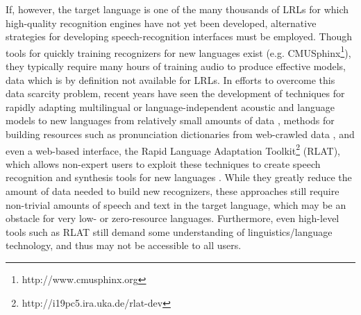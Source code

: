\documentclass[11pt]{article}
\begin{document}
If, however, the target language is one of the many thousands of LRLs for which high-quality recognition engines have not yet been developed, alternative strategies for developing speech-recognition interfaces must be employed.
Though tools for quickly training recognizers for new languages exist (e.g. CMUSphinx\footnote{http://www.cmusphinx.org}), they typically require many hours of training audio to produce effective models, 
data which is by definition not available for LRLs.
In efforts to overcome this data scarcity problem, 
recent years have seen the development of 
techniques for rapidly adapting multilingual or language-independent acoustic and language models to new languages from relatively small amounts of data \cite{schultz01,kim03}, methods for building resources such as pronunciation dictionaries from web-crawled data \cite{Schlippe14}, and even a web-based interface, the Rapid Language Adaptation Toolkit\footnote{http://i19pc5.ira.uka.de/rlat-dev}
(RLAT), 
which allows non-expert users to exploit these techniques to create speech recognition and synthesis tools for new languages \cite{vu10}. 
While they greatly reduce the amount of data needed to build new recognizers, %
these approaches still require non-trivial amounts of speech and text in the target language, which may be an obstacle for very low- or zero-resource languages. Furthermore, even high-level tools such as RLAT still demand some understanding of linguistics/language technology, and thus may not be accessible to all users.
\end{document}
